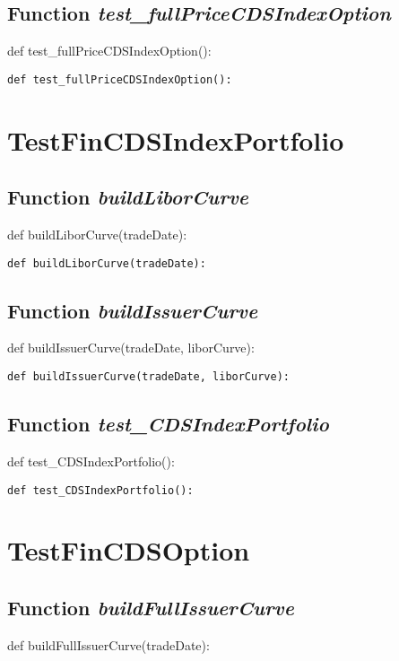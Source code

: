 \documentclass[twoside,11pt]{book}
\begin{document}
\subsection{Function {\it test\_fullPriceCDSIndexOption}}
def test\_fullPriceCDSIndexOption():

\begin{lstlisting}
def test_fullPriceCDSIndexOption():
\end{lstlisting}


\newpage
\section{TestFinCDSIndexPortfolio}

\subsection{Function {\it buildLiborCurve}}
def buildLiborCurve(tradeDate):

\begin{lstlisting}
def buildLiborCurve(tradeDate):
\end{lstlisting}

\subsection{Function {\it buildIssuerCurve}}
def buildIssuerCurve(tradeDate, liborCurve):

\begin{lstlisting}
def buildIssuerCurve(tradeDate, liborCurve):
\end{lstlisting}

\subsection{Function {\it test\_CDSIndexPortfolio}}
def test\_CDSIndexPortfolio():

\begin{lstlisting}
def test_CDSIndexPortfolio():
\end{lstlisting}


\newpage
\section{TestFinCDSOption}

\subsection{Function {\it buildFullIssuerCurve}}
def buildFullIssuerCurve(tradeDate):
\end{document}
